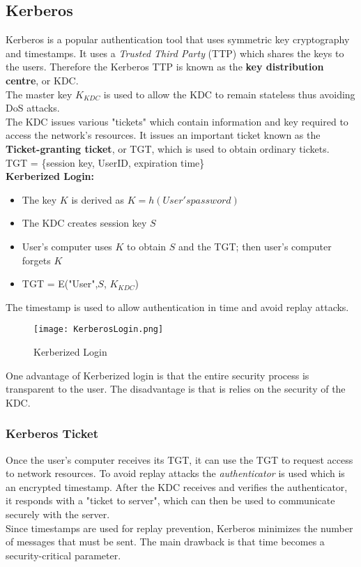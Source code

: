 \documentclass{article}
\begin{document}
\subsection{Kerberos}
Kerberos is a popular authentication tool that uses symmetric key cryptography and timestamps. It uses a \textit{Trusted Third Party} (TTP) which shares the keys to the users. Therefore the Kerberos TTP is known as the \textbf{key distribution centre}, or KDC.\\
The master key $K_{KDC}$ is used to allow the KDC to remain stateless thus avoiding DoS attacks.\\
The KDC issues various "tickets" which contain information and key required to access the network's resources. It issues an important ticket known as the \textbf{Ticket-granting ticket}, or TGT, which is used to obtain ordinary tickets.\\
TGT = \{session key, UserID, expiration time\}\\
\textbf{Kerberized Login:}
\begin{itemize}
    \item The key $K$ is derived as $K = h(User's password)$
    \item The KDC creates session key $S$
    \item User's computer uses $K$ to obtain $S$ and the TGT; then user's computer forgets $K$
    \item TGT = E("User",$S$, $K_{KDC}$)
\end{itemize}{}
The timestamp is used to allow authentication in time and avoid replay attacks.
\begin{figure}[H]
    \centering
    \texttt{[image: KerberosLogin.png]}
    \caption{Kerberized Login}
\end{figure}
One advantage of Kerberized login is that the entire security process is transparent to the user. The disadvantage is that is relies on the security of the KDC.

\subsubsection{Kerberos Ticket}
Once the user's computer receives its TGT, it can use the TGT to request access to network resources. To avoid replay attacks the \textit{authenticator} is used which is an encrypted timestamp. After the KDC receives and verifies the authenticator, it responds with a "ticket to server", which can then be used to communicate securely with the server.\\
Since timestamps are used for replay prevention, Kerberos minimizes the number of messages that must be sent. The main drawback is that time becomes a security-critical parameter.
\end{document}
